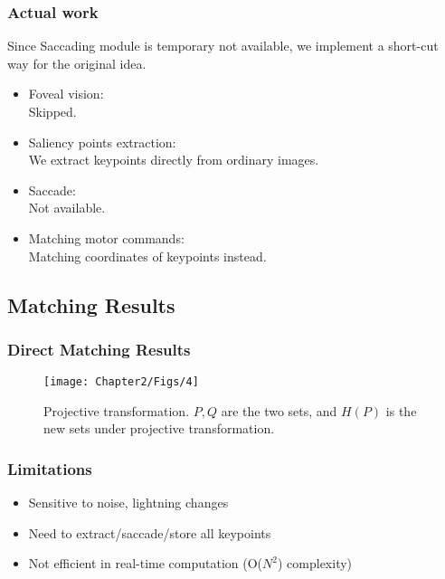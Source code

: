 \documentclass{beamer}
\begin{document}
\begin{frame}
\frametitle{Actual work}
Since Saccading module is temporary not available, we implement a short-cut way for the original idea.\\

\begin{itemize}
\item Foveal vision:\\	
Skipped.
\item Saliency points extraction:\\
We extract keypoints directly from ordinary images.
\item Saccade:\\
Not available.
\item Matching motor commands:\\
Matching coordinates of keypoints instead. 
\end{itemize}
\end{frame}


\subsection{Matching Results}

\begin{frame}
\frametitle{Direct Matching Results}
\begin{figure}
\centering    
\texttt{[image: Chapter2/Figs/4]}
\caption{Projective transformation. $P,Q$ are the two sets, and $H(P)$ is the new sets under projective transformation.}
\label{fig:2.7}
\end{figure}%

\end{frame}

\begin{frame}
\frametitle{Limitations}
\begin{itemize}
\item Sensitive to noise, lightning changes
\item Need to extract/saccade/store all keypoints
\item Not efficient in real-time computation (O($N^2$) complexity) 
\end{itemize}
\end{frame}
\end{document}
